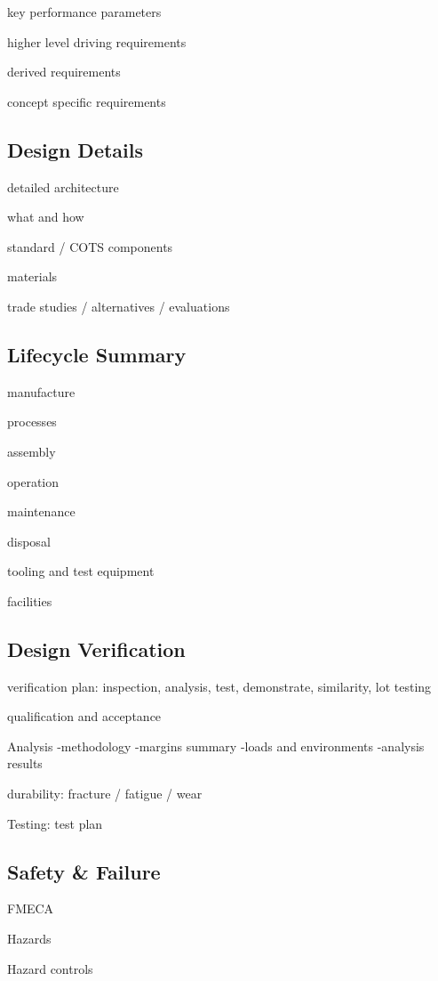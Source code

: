 \documentclass[12pt]{article}
\begin{document}
key performance parameters

higher level driving requirements

derived requirements

concept specific requirements


\subsection{Design Details}

detailed architecture

what and how

standard / COTS components

materials


trade studies / alternatives / evaluations


\subsection{Lifecycle Summary}



manufacture

processes

assembly

operation

maintenance

disposal

tooling and test equipment

facilities


\subsection{Design Verification}

verification plan: inspection, analysis, test, demonstrate, similarity, lot testing

qualification and acceptance

Analysis
-methodology
-margins summary
-loads and environments
-analysis results

durability: fracture / fatigue / wear

Testing: test plan


\subsection{Safety \& Failure}

FMECA

Hazards

Hazard controls
\end{document}
